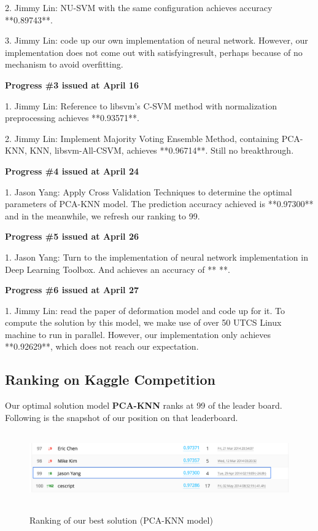 \documentclass{article} %
\begin{document}
2. Jimmy Lin: NU-SVM with the same configuration achieves accuracy **0.89743**.

3. Jimmy Lin: code up our own implementation of neural network. However,
our implementation does not come out with satisfyingresult, perhaps because of
no mechanism to avoid overfitting.  

{\bf Progress \#3 issued at April 16 }

1. Jimmy Lin: Reference to libsvm's C-SVM method with normalization preprocessing achieves **0.93571**.

2. Jimmy Lin: Implement Majority Voting Ensemble Method, containing PCA-KNN, KNN, libsvm-All-CSVM,
achieves **0.96714**. Still no breakthrough.

{\bf Progress \#4 issued at April 24 }

1. Jason Yang: Apply Cross Validation Techniques to determine the optimal parameters of
PCA-KNN model. The prediction accuracy achieved is **0.97300** and in the
meanwhile, we refresh our ranking to 99.


{\bf Progress \#5 issued at April 26 }

1. Jason Yang: Turn to the implementation of neural network implementation in
Deep Learning Toolbox. And achieves an accuracy of ** **.

{\bf Progress \#6 issued at April 27 }

1. Jimmy Lin: read the paper of deformation model and code up for it. To
compute the solution by this model, we make use of over 50 UTCS Linux machine
to run in parallel. However, our implementation only achieves **0.92629**,
which does not reach our expectation.

\subsection{Ranking on Kaggle Competition}

Our optimal solution model {\bf PCA-KNN} ranks at 99 of the leader board.
Following is the snapshot of our position on that leaderboard.

\begin{figure}[h]
    \centering
    \includegraphics[width=5.5in,height=1.2in]{./images/Rank.png} \\
    \caption{Ranking of our best solution (PCA-KNN model)}
\end{figure}
\end{document}
